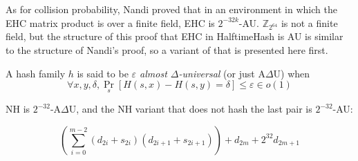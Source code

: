 \documentclass[runningheads]{llncs}
\newcommand{\ints}{\mathbb{Z}}
\begin{document}





As for collision probability, Nandi proved that in an environment in which the EHC matrix product is over a finite field, EHC is $2^{-32k}$-AU.
$\ints_{2^{64}}$ is not a finite field, but the structure of this proof that EHC in HalftimeHash is AU is similar to the structure of Nandi's proof, so a variant of that is presented here first.  \cite{ehc-nandi}

\begin{definition}
  A hash family $h$ is said to be {\em $\varepsilon$ almost $\Delta$-universal} (or just A$\Delta$U) when
  \[
  \forall x,y,\delta, \Pr_s[H(s,x) - H(s,y) = \delta] \leq \varepsilon \in o(1)
  \]
\end{definition}

NH is $2^{-32}$-A$\Delta$U, and the NH variant that does not hash the last pair is $2^{-32}$-AU:

\[
\left(\sum_{i=0}^{m-2} (d_{2i} + s_{2i})(d_{2i+1} + s_{2i+1})\right) + d_{2m} + 2^{32} d_{2m+1}
\]
\end{document}
